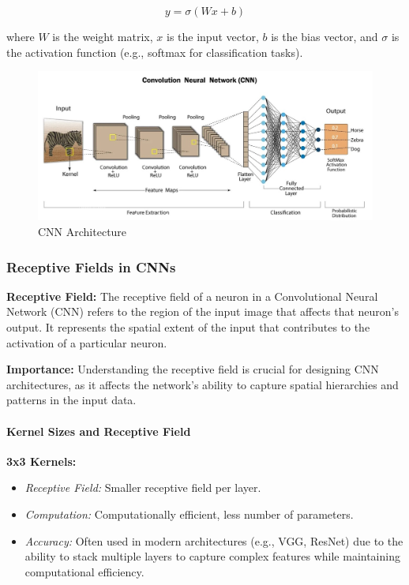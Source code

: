 \documentclass[12pt]{article}
\begin{document}
\[
y = \sigma(Wx + b)
\]

where \( W \) is the weight matrix, \( x \) is the input vector, \( b \) is the bias vector, and \( \sigma \) is the activation function (e.g., softmax for classification tasks).

\begin{figure}[h]
    \centering
    \includegraphics[scale=0.3]{./media/cnn.jpeg}
    \caption{CNN Architecture}
    \label{fig:cnn_arch}
\end{figure}

\subsubsection{Receptive Fields in CNNs}

\textbf{Receptive Field:}
The receptive field of a neuron in a Convolutional Neural Network (CNN) refers to the region of the input image that affects that neuron's output. It represents the spatial extent of the input that contributes to the activation of a particular neuron.

\textbf{Importance:}
Understanding the receptive field is crucial for designing CNN architectures, as it affects the network's ability to capture spatial hierarchies and patterns in the input data.

\paragraph{Kernel Sizes and Receptive Field}

\textbf{3x3 Kernels:}
\begin{itemize}
    \item \textit{Receptive Field:} Smaller receptive field per layer.
    \item \textit{Computation:} Computationally efficient, less number of parameters.
    \item \textit{Accuracy:} Often used in modern architectures (e.g., VGG, ResNet) due to the ability to stack multiple layers to capture complex features while maintaining computational efficiency.
\end{itemize}
\end{document}

